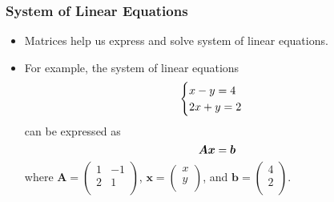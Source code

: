 \documentclass[pdflatex, 12pt]{beamer}
\begin{document}
\begin{frame}
\frametitle{System of Linear Equations}
\begin{itemize}
\item Matrices help us express and solve system of linear equations.
\vspace{0.4cm}
\item For example, the system of linear equations
 \begin{eqnarray}
 \begin{cases}
 x - y = 4 \\
 2x + y = 2 \notag
 \end{cases}
 \end{eqnarray}
can be expressed as 
 \begin{equation}
 \bm{Ax} = \bm{b} \notag 
 \end{equation}
where $\bm{A} = \begin{pmatrix}
1 & -1 \\
2 & 1 \\
\end{pmatrix}$, $\bm{x} = \begin{pmatrix}
x \\
y \\
\end{pmatrix}$, and $\bm{b} = \begin{pmatrix}
4 \\
2 \\
\end{pmatrix}$.
\end{itemize}
\end{frame}
\end{document}
